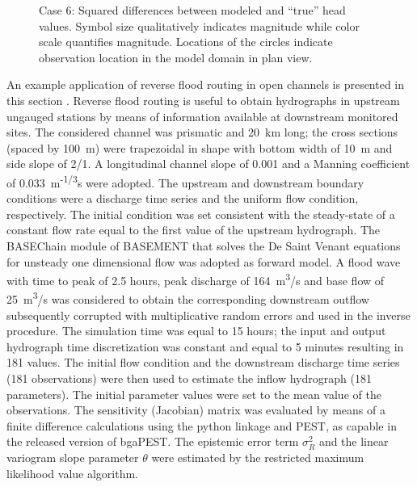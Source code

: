 \documentclass[11pt,oneside,onecolumn]{usgsreport}
\begin{document}
\begin{appendix}
\begin{figure}[!t]
\caption{\label{fig:3Lresid_case6}Case 6: Squared differences between modeled
and ``true'' head values. Symbol size qualitatively indicates magnitude
while color scale quantifies magnitude. Locations of the circles indicate
observation location in the model domain in plan view.}
\end{figure}




An example application of reverse flood routing in open channels is
presented in this section \citep{doriareverserouting}. Reverse flood
routing is useful to obtain hydrographs in upstream ungauged stations
by means of information available at downstream monitored sites. The
considered channel was prismatic and 20~km long; the cross sections
(spaced by 100~m) were trapezoidal in shape with bottom width of
10~m and side slope of 2/1. A longitudinal channel slope of 0.001
and a Manning coefficient of 0.033~m\textsuperscript{-1/3}s were
adopted. The upstream and downstream boundary conditions were a discharge
time series and the uniform flow condition, respectively. The initial
condition was set consistent with the steady-state of a constant flow
rate equal to the first value of the upstream hydrograph. The BASEChain
module of BASEMENT \citep{Basement} that solves the De Saint Venant
equations for unsteady one dimensional flow was adopted as forward
model. A flood wave with time to peak of 2.5 hours, peak discharge
of 164~m\textsuperscript{3}/s and base flow of 25~m\textsuperscript{3}/s
was considered to obtain the corresponding downstream outflow subsequently
corrupted with multiplicative random errors and used in the inverse
procedure. The simulation time was equal to 15 hours; the input and
output hydrograph time discretization was constant and equal to 5
minutes resulting in 181 values. The initial flow condition and the
downstream discharge time series (181 observations) were then used
to estimate the inflow hydrograph (181 parameters). The initial parameter
values were set to the mean value of the observations. The sensitivity
(Jacobian) matrix was evaluated by means of a finite difference calculations
using the python linkage and PEST, as capable in the released version
of bgaPEST. The epistemic error term $\sigma_{R}^{2}$ and the linear
variogram slope parameter $\theta$ were estimated by the restricted
maximum likelihood value algorithm. 


\end{appendix}
\end{document}
